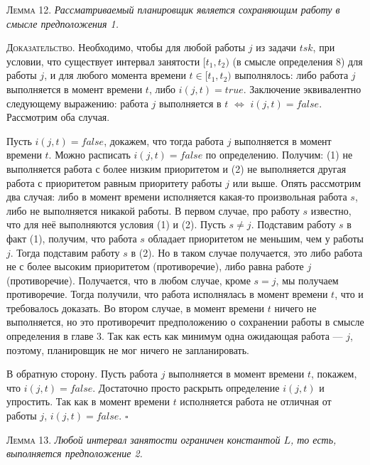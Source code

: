 \textsc{Лемма 12.}
\textit{Рассматриваемый планировщик является сохраняющим работу в смысле предположения 1.}

\textsc{Доказательство.} Необходимо, чтобы для любой работы $j$ из задачи $tsk$,
  при условии, что существует интервал занятости $[t_1, t_2)$ (в смысле определения 8)
  для работы $j$, и для любого момента времени $t \in [t_1, t_2)$ выполнялось:
   либо работа $j$ выполняется в момент времени $t$, либо $i(j,t) = true$.
  Заключение эквивалентно следующему выражению: работа $j$ выполняется в $t$
    $\Leftrightarrow$ $i(j,t) = false$. Рассмотрим оба случая.

  Пусть $i(j,t) = false$, докажем, что тогда работа $j$ выполняется в момент
    времени $t$. Можно расписать $i(j,t) = false$ по определению.
    Получим: (1) не выполняется работа с более низким приоритетом и (2) не выполняется
    другая работа с приоритетом равным приоритету работы $j$ или выше. Опять рассмотрим
    два случая: либо в момент времени исполняется какая-то произвольная работа $s$, либо не выполняется никакой работы.
  В первом случае, про работу $s$ известно, что для неё выполняются условия (1) и (2).
    Пусть $s \neq j$. Подставим работу $s$ в факт (1), получим, что работа $s$ обладает
    приоритетом не меньшим, чем у работы $j$. Тогда подставим работу $s$ в (2). Но в таком случае получается, это либо работа не с более высоким приоритетом (противоречие), либо равна работе $j$ (противоречие). Получается, что в любом случае, кроме $s = j$, мы получаем противоречие. Тогда получили, что работа
    исполнялась в момент времени $t$, что и требовалось доказать.
  Во втором случае, в момент времени $t$ ничего не выполняется, но это противоречит
    предположению о сохранении работы в смысле определения в главе 3.
  Так как есть как минимум одна ожидающая работа --- $j$, поэтому, планировщик не мог ничего не запланировать.

  В обратную сторону. Пусть работа $j$ выполняется в момент времени $t$, покажем, что $i(j,t) = false$.
    Достаточно просто раскрыть определение $i(j,t)$ и упростить. Так как в момент времени $t$
    исполняется работа не отличная от работы $j$, $i(j,t) = false$.
$\square$


\textsc{Лемма 13.}
\textit{Любой интервал занятости ограничен константой $L$, то есть, выполняется предположение 2. }

